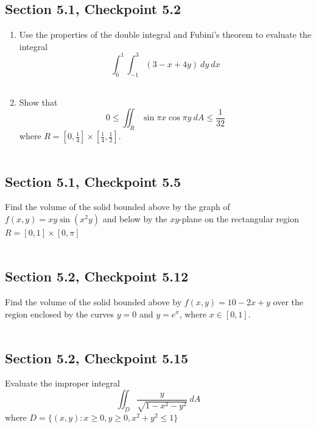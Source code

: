 \documentclass[]{mangos-musings}
\begin{document}
\subsection{Section 5.1, Checkpoint 5.2}
\begin{enumerate}[label=(\alph*)]
  \item Use the properties of the double integral and Fubini's theorem to evaluate the integral
  \[
    \int_{0}^{1}\int_{-1}^{3} (3 - x + 4y) \ dy \ dx 
  \]
  \begin{align*}
    \\ \\
  \end{align*}
  \item Show that 
  \[
    0 \le \iint_R \sin \pi x \cos \pi y \ dA \le \frac{1}{32}
  \]
  where $R = \left[0, \frac{1}{4}\right]\times \left[\frac{1}{4}, \frac{1}{2}\right]$.
  \begin{align*}
    \\ \\
  \end{align*}
\end{enumerate}
%
%
%
%
\subsection{Section 5.1, Checkpoint 5.5}
Find the volume of the solid bounded above by the graph of $f(x, y) = xy\sin (x^2 y)$ and below by the $xy$-plane on the rectangular region $R = [0,1]\times [0, \pi]$ 
\begin{align*}
  \\ \\
\end{align*}
%
%
%
%
\subsection{Section 5.2, Checkpoint 5.12}
Find the volume of the solid bounded above by $f(x, y) = 10 - 2x + y$ over the region enclosed by the curves $y = 0$ and $y = e^x$, where $x\in [0, 1]$.
\begin{align*}
  \\ \\
\end{align*}
%
%
%
%
\newpage
\subsection{Section 5.2, Checkpoint 5.15}
Evaluate the improper integral 
\[\iint_D \frac{y}{\sqrt{1 - x^2 - y^2}} \ dA \]
where $D = \{(x, y) : x\ge 0, y \ge 0, x^2 + y^2 \le 1\}$
\begin{align*}
  \\ \\
\end{align*}
%
%
%
%
\end{document}
